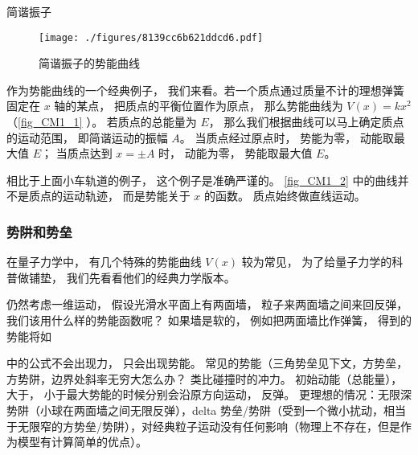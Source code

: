 \begin{example}{简谐振子}\label{ex_CM1_1}
\begin{figure}[ht]
\centering
\texttt{[image: ./figures/8139cc6b621ddcd6.pdf]}
\caption{简谐振子的势能曲线} \label{fig_CM1_2}
\end{figure}

作为势能曲线的一个经典例子， 我们来看。若一个质点通过质量不计的理想弹簧固定在 $x$ 轴的某点， 把质点的平衡位置作为原点， 那么势能曲线为 $V(x) = kx^2$（\autoref{fig_CM1_1} ）。 若质点的总能量为 $E$， 那么我们根据曲线可以马上确定质点的运动范围， 即简谐运动的振幅 $A$。 当质点经过原点时， 势能为零， 动能取最大值 $E$； 当质点达到 $x = \pm A$ 时， 动能为零， 势能取最大值 $E$。
\end{example}
相比于上面小车轨道的例子， 这个例子是准确严谨的。 \autoref{fig_CM1_2} 中的曲线并不是质点的运动轨迹， 而是势能关于 $x$ 的函数。 质点始终做直线运动。

\subsubsection{势阱和势垒}
在量子力学中， 有几个特殊的势能曲线 $V(x)$ 较为常见， 为了给量子力学的科普做铺垫， 我们先看看他们的经典力学版本。



仍然考虑一维运动， 假设光滑水平面上有两面墙， 粒子来两面墙之间来回反弹， 我们该用什么样的势能函数呢？ 如果墙是软的， 例如把两面墙比作弹簧， 得到的势能将如

中的公式不会出现力， 只会出现势能。 常见的势能（三角势垒见下文，方势垒，方势阱，边界处斜率无穷大怎么办？ 类比碰撞时的冲力。 初始动能（总能量）， 大于， 小于最大势能的时候分别会沿原方向运动， 反弹。 更理想的情况：无限深势阱（小球在两面墙之间无限反弹），delta 势垒/势阱（受到一个微小扰动，相当于无限窄的方势垒/势阱），对经典粒子运动没有任何影响（物理上不存在，但是作为模型有计算简单的优点）。
